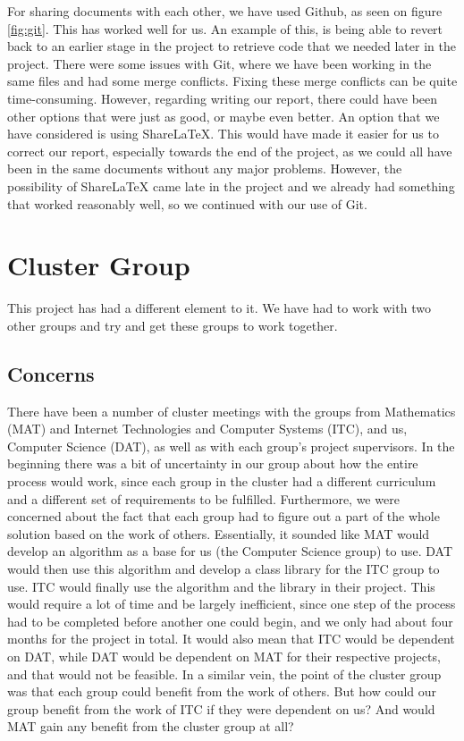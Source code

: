 \documentclass{article}
\begin{document}
For sharing documents with each other, we have used Github, as seen on figure \ref{fig:git}.
This has worked well for us. 
An example of this, is being able to revert back to an earlier stage in the project to retrieve code that we needed later in the project. There were some issues with Git, where we have been working in the same files and had some merge conflicts. Fixing these merge conflicts can be quite time-consuming.
However, regarding writing our report, there could have been other options that were just as good, or maybe even better. An option that we have considered is using ShareLaTeX. This would have made it easier for us to correct our report, especially towards the end of the project, as we could all have been in the same documents without any major problems. However, the possibility of ShareLaTeX came late in the project and we already had something that worked reasonably well, so we continued with our use of Git.


\section{Cluster Group}
This project has had a different element to it. We have had to work with two other groups and try and get these groups to work together.
\subsection*{Concerns}
There have been a number of cluster meetings with the groups from Mathematics (MAT) and Internet Technologies and Computer Systems (ITC), and us, Computer Science (DAT), as well as with each group's project supervisors.
In the beginning there was a bit of uncertainty in our group about how the entire process would work, since each group in the cluster had a different curriculum and a different set of requirements to be fulfilled.
Furthermore, we were concerned about the fact that each group had to figure out a part of the whole solution based on the work of others.
Essentially, it sounded like MAT would develop an algorithm as a base for us (the Computer Science group) to use.
DAT would then use this algorithm and develop a class library for the ITC group to use.
ITC would finally use the algorithm and the library in their project.
This would require a lot of time and be largely inefficient, since one step of the process had to be completed before another one could begin, and we only had about four months for the project in total.
It would also mean that ITC would be dependent on DAT, while DAT would be dependent on MAT for their respective projects, and that would not be feasible.
In a similar vein, the point of the cluster group was that each group could benefit from the work of others.
But how could our group benefit from the work of ITC if they were dependent on us? And would MAT gain any benefit from the cluster group at all?
\end{document}
